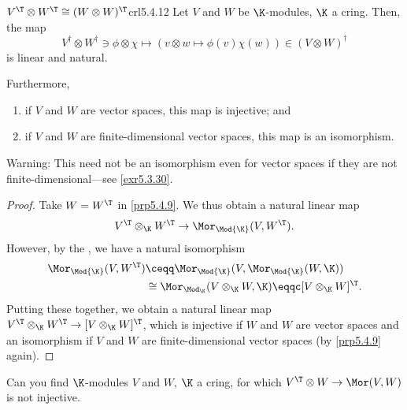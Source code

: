 \begin{crl}{$V^{\T}\otimes W^{\T}\cong (W\otimes W)^{\T}$}{crl5.4.12}
	Let $V$ and $W$ be $\K$-modules, $\K$ a cring.  Then, the map
	\begin{equation}
	V^{\dagger}\otimes W^{\dagger}\ni \phi \otimes \chi \mapsto (v\otimes w\mapsto \phi (v)\chi (w))\in (V\otimes W)^{\dagger}
	\end{equation}
	is linear and natural.
	
	Furthermore,
	\begin{enumerate}
		\item if $V$ and $W$ are vector spaces, this map is injective; and
		\item if $V$ and $W$ are finite-dimensional vector spaces, this map is an isomorphism.
	\end{enumerate}
	\begin{rmk}
		Warning:  This need not be an isomorphism even for vector spaces if they are not finite-dimensional---see \cref{exr5.3.30}.
	\end{rmk}
	\begin{proof}
		Take $W=W^{\T}$ in \cref{prp5.4.9}.  We thus obtain a natural linear map
		\begin{equation}
			V^{\T}\otimes _{\K}W^{\T}\rightarrow \Mor _{\Mod{\K}}(V,W^{\T}).
		\end{equation}
		However, by the , we have a natural isomorphism
		\begin{equation}
			\begin{split}
				\Mor _{\Mod{\K}}(V,W^{\T}) & \ceqq \Mor _{\Mod{\K}}(V,\Mor _{\Mod{\K}}(W,\K )) \\
				& \cong \Mor _{\Mod _{\K}}(V\otimes _{\K}W,\K )\eqqc [V\otimes _{\K}W]^{\T}.
			\end{split}
		\end{equation}
		Putting these together, we obtain a natural linear map $V^{\T}\otimes _{\K}W^{\T}\rightarrow [V\otimes _{\K}W]^{\T}$, which is injective if $W$ and $W$ are vector spaces and an isomorphism if $V$ and $W$ are finite-dimensional vector spaces (by \cref{prp5.4.9} again).
	\end{proof}
\end{crl}
\begin{exr}{}{}
	Can you find $\K$-modules $V$ and $W$, $\K$ a cring, for which $V^{\T}\otimes W\rightarrow \Mor (V,W)$ is not injective.
\end{exr}
